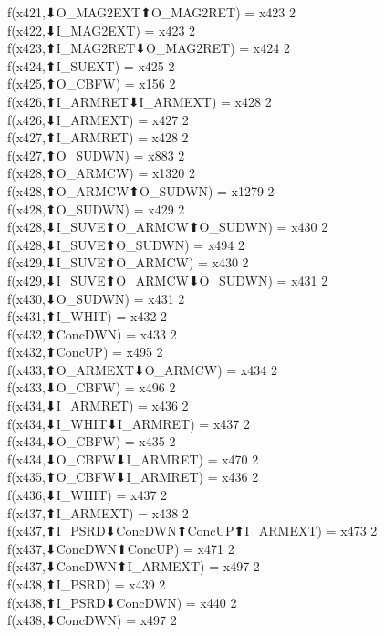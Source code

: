 f(x421,⬇O_MAG2EXT⬆O_MAG2RET) = x423 {2} \\
f(x422,⬇I_MAG2EXT) = x423 {2} \\
f(x423,⬆I_MAG2RET⬇O_MAG2RET) = x424 {2} \\
f(x424,⬆I_SUEXT) = x425 {2} \\
f(x425,⬆O_CBFW) = x156 {2} \\
f(x426,⬆I_ARMRET⬇I_ARMEXT) = x428 {2} \\
f(x426,⬇I_ARMEXT) = x427 {2} \\
f(x427,⬆I_ARMRET) = x428 {2} \\
f(x427,⬆O_SUDWN) = x883 {2} \\
f(x428,⬆O_ARMCW) = x1320 {2} \\
f(x428,⬆O_ARMCW⬆O_SUDWN) = x1279 {2} \\
f(x428,⬆O_SUDWN) = x429 {2} \\
f(x428,⬇I_SUVE⬆O_ARMCW⬆O_SUDWN) = x430 {2} \\
f(x428,⬇I_SUVE⬆O_SUDWN) = x494 {2} \\
f(x429,⬇I_SUVE⬆O_ARMCW) = x430 {2} \\
f(x429,⬇I_SUVE⬆O_ARMCW⬇O_SUDWN) = x431 {2} \\
f(x430,⬇O_SUDWN) = x431 {2} \\
f(x431,⬆I_WHIT) = x432 {2} \\
f(x432,⬆ConcDWN) = x433 {2} \\
f(x432,⬆ConcUP) = x495 {2} \\
f(x433,⬆O_ARMEXT⬇O_ARMCW) = x434 {2} \\
f(x433,⬇O_CBFW) = x496 {2} \\
f(x434,⬇I_ARMRET) = x436 {2} \\
f(x434,⬇I_WHIT⬇I_ARMRET) = x437 {2} \\
f(x434,⬇O_CBFW) = x435 {2} \\
f(x434,⬇O_CBFW⬇I_ARMRET) = x470 {2} \\
f(x435,⬆O_CBFW⬇I_ARMRET) = x436 {2} \\
f(x436,⬇I_WHIT) = x437 {2} \\
f(x437,⬆I_ARMEXT) = x438 {2} \\
f(x437,⬆I_PSRD⬇ConcDWN⬆ConcUP⬆I_ARMEXT) = x473 {2} \\
f(x437,⬇ConcDWN⬆ConcUP) = x471 {2} \\
f(x437,⬇ConcDWN⬆I_ARMEXT) = x497 {2} \\
f(x438,⬆I_PSRD) = x439 {2} \\
f(x438,⬆I_PSRD⬇ConcDWN) = x440 {2} \\
f(x438,⬇ConcDWN) = x497 {2} \\
